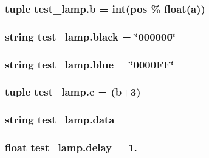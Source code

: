 \subsubsection[{b}]{\setlength{\rightskip}{0pt plus 5cm}tuple test\+\_\+lamp.\+b = int({\bf pos} \% float({\bf a}))}\label{namespacetest__lamp_ad2879a9a1a10baabf94f89a5342c30b4}
\hypertarget{namespacetest__lamp_a3fcd0129cd517124f65cc0cb7173ebdd}{}
\subsubsection[{black}]{\setlength{\rightskip}{0pt plus 5cm}string test\+\_\+lamp.\+black = \char`\"{}000000\char`\"{}}\label{namespacetest__lamp_a3fcd0129cd517124f65cc0cb7173ebdd}
\hypertarget{namespacetest__lamp_a7f447446745812eae2674efdeb1a94ed}{}
\subsubsection[{blue}]{\setlength{\rightskip}{0pt plus 5cm}string test\+\_\+lamp.\+blue = \char`\"{}0000\+F\+F\char`\"{}}\label{namespacetest__lamp_a7f447446745812eae2674efdeb1a94ed}
\hypertarget{namespacetest__lamp_af861b03726bd4fc04350abc65413da17}{}
\subsubsection[{c}]{\setlength{\rightskip}{0pt plus 5cm}tuple test\+\_\+lamp.\+c = ({\bf b}+3)}\label{namespacetest__lamp_af861b03726bd4fc04350abc65413da17}
\hypertarget{namespacetest__lamp_a3bbaeee85014b3f126907a5f2437d3a5}{}
\subsubsection[{data}]{\setlength{\rightskip}{0pt plus 5cm}string test\+\_\+lamp.\+data = \textquotesingle{}\textquotesingle{}}\label{namespacetest__lamp_a3bbaeee85014b3f126907a5f2437d3a5}
\hypertarget{namespacetest__lamp_ae5d1a14ec1ec8e97cf8938be9386e507}{}
\subsubsection[{delay}]{\setlength{\rightskip}{0pt plus 5cm}float test\+\_\+lamp.\+delay = 1.}\label{namespacetest__lamp_ae5d1a14ec1ec8e97cf8938be9386e507}
\hypertarget{namespacetest__lamp_a3f074fe7b6f4e5692ca115354c4b282f}{}
